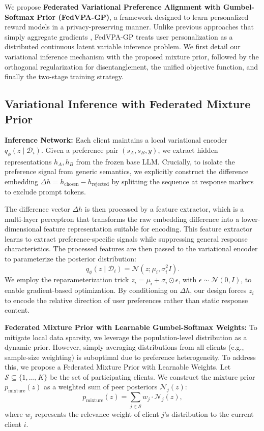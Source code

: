 We propose \textbf{Federated Variational Preference Alignment with Gumbel-Softmax Prior (FedVPA-GP)}, a framework designed to learn personalized reward models in a privacy-preserving manner. Unlike previous approaches that simply aggregate gradients \citep{wu2024towards}, FedVPA-GP treats user personalization as a distributed continuous latent variable inference problem. We first detail our variational inference mechanism with the proposed mixture prior, followed by the orthogonal regularization for disentanglement, the unified objective function, and finally the two-stage training strategy.

\subsection{Variational Inference with Federated Mixture Prior}
\label{sec:variational}

\textbf{Inference Network:} Each client maintains a local variational encoder $q_\phi(z \mid \mathcal{D}_i)$. Given a preference pair $(s_A, s_B, y)$, we extract hidden representations $h_A, h_B$ from the frozen base LLM. Crucially, to isolate the preference signal from generic semantics, we explicitly construct the difference embedding $\Delta h = h_{\text{chosen}} - h_{\text{rejected}}$ by splitting the sequence at response markers to exclude prompt tokens. 

The difference vector $\Delta h$ is then processed by a feature extractor, which is a multi-layer perceptron that transforms the raw embedding difference into a lower-dimensional feature representation suitable for encoding. This feature extractor learns to extract preference-specific signals while suppressing general response characteristics. The processed features are then passed to the variational encoder to parameterize the posterior distribution:
\begin{equation}
    q_\phi(z \mid \mathcal{D}_i) = \mathcal{N}(z; \mu_i, \sigma_i^2 I).
\end{equation}
We employ the reparameterization trick $z_i = \mu_i + \sigma_i \odot \epsilon$, with $\epsilon \sim \mathcal{N}(0, I)$, to enable gradient-based optimization. By conditioning on $\Delta h$, our design forces $z_i$ to encode the relative direction of user preferences rather than static response content.


\textbf{Federated Mixture Prior with Learnable Gumbel-Softmax Weights:}
To mitigate local data sparsity, we leverage the population-level distribution as a dynamic prior. However, simply averaging distributions from all clients (e.g., sample-size weighting) is suboptimal due to preference heterogeneity. To address this, we propose a Federated Mixture Prior with Learnable Weights. Let $\mathcal{S} \subseteq \{1, \dots, K\}$ be the set of participating clients. We construct the mixture prior $p_{\text{mixture}}(z)$ as a weighted sum of peer posteriors $\mathcal{N}_j(z)$:
\begin{equation}
    p_{\text{mixture}}(z) = \sum_{j \in \mathcal{S}} w_j \cdot \mathcal{N}_j(z),
\end{equation}
where $w_j$ represents the relevance weight of client $j$'s distribution to the current client $i$.

